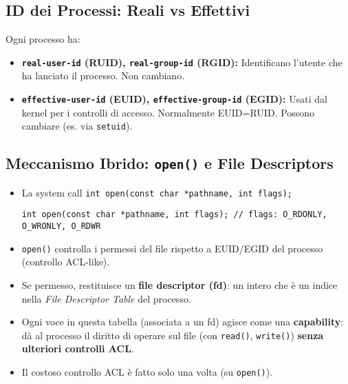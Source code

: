 \documentclass{article}
\begin{document}
\subsection{ID dei Processi: Reali vs Effettivi}
Ogni processo ha:
\begin{itemize}
    \item \textbf{\texttt{real-user-id} (RUID), \texttt{real-group-id} (RGID):} Identificano l'utente che ha lanciato il processo. Non cambiano.
    \item \textbf{\texttt{effective-user-id} (EUID), \texttt{effective-group-id} (EGID):} Usati dal kernel per i controlli di accesso. Normalmente EUID=RUID. Possono cambiare (es. via \texttt{setuid}).
\end{itemize}

\subsection{Meccanismo Ibrido: \texttt{open()} e File Descriptors}
\begin{itemize}
    \item La system call \texttt{int open(const char *pathname, int flags);}
    \begin{verbatim}
int open(const char *pathname, int flags); // flags: O_RDONLY, O_WRONLY, O_RDWR
    \end{verbatim}
    \item \texttt{open()} controlla i permessi del file rispetto a EUID/EGID del processo (controllo ACL-like).
    \item Se permesso, restituisce un \textbf{file descriptor (fd)}: un intero che è un indice nella \textit{File Descriptor Table} del processo.
    \item Ogni voce in questa tabella (associata a un fd) agisce come una \textbf{capability}: dà al processo il diritto di operare sul file (con \texttt{read()}, \texttt{write()}) \textbf{senza ulteriori controlli ACL}.
    \item Il costoso controllo ACL è fatto solo una volta (su \texttt{open()}).
\end{itemize}
\end{document}
